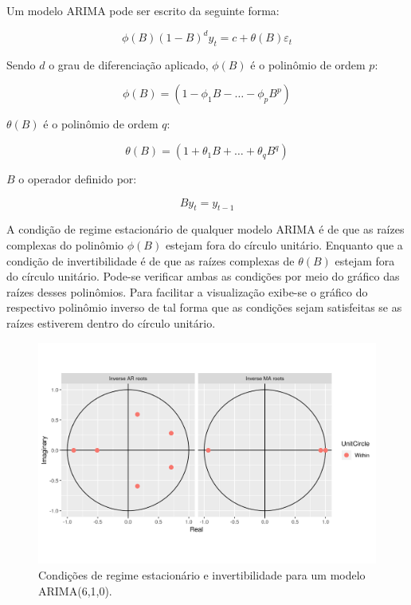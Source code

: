 \documentclass[
	12pt,				%
	openright,			%
	oneside,			%
	a4paper,			%
	english,			%
	french,				%
	spanish,			%
	brazil				%
	]{abntex2}
\begin{document}
Um modelo ARIMA pode ser escrito da seguinte forma: 


\begin{equation}
\phi(B)(1-B)^dy_t = c + \theta(B)\varepsilon_t
\end{equation}

Sendo $d$ o grau de diferenciação aplicado, $\phi(B)$ é o polinômio de ordem $p$:

\begin{equation}
\phi(B) = (1-\phi_1B-\dots-\phi_pB^p)
\end{equation}

$\theta(B)$ é o polinômio de ordem $q$:

\begin{equation}
\theta(B) = (1+\theta_1B+\dots+\theta_qB^q)
\end{equation}

$B$ o operador definido por:

\begin{equation}
By_{t} = y_{t-1}
\end{equation}

A condição de regime estacionário de qualquer modelo ARIMA é de que as raízes complexas do polinômio $\phi(B)$ estejam fora do círculo unitário. Enquanto que a condição de invertibilidade é de que as raízes complexas de $\theta(B)$ estejam fora do círculo unitário. Pode-se verificar ambas as condições por meio do gráfico das raízes desses polinômios. Para facilitar a visualização exibe-se o gráfico do respectivo polinômio inverso de tal forma que as condições sejam satisfeitas se as raízes estiverem dentro do círculo unitário.

\begin{figure}[h]
    \centering
	\includegraphics[width=\textwidth]{conds}
	\caption{Condições de regime estacionário e invertibilidade para um modelo ARIMA(6,1,0).}
\end{figure}
\FloatBarrier
\end{document}
